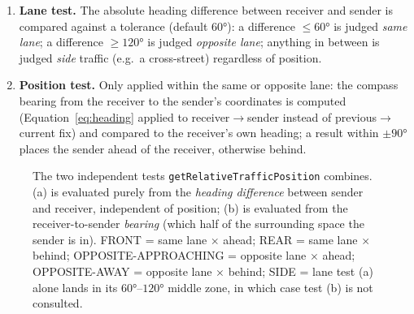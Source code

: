 \documentclass[12pt,a4paper]{report}
\begin{document}
\begin{enumerate}[leftmargin=1.8em]
\item \textbf{Lane test.} The absolute heading difference between receiver and sender is compared against a tolerance (default $60°$): a difference $\le 60°$ is judged \emph{same lane}; a difference $\ge 120°$ is judged \emph{opposite lane}; anything in between is judged \emph{side} traffic (e.g.\ a cross-street) regardless of position.
\item \textbf{Position test.} Only applied within the same or opposite lane: the compass bearing from the receiver to the sender's coordinates is computed (Equation~\ref{eq:heading} applied to receiver$\to$sender instead of previous$\to$current fix) and compared to the receiver's own heading; a result within $\pm90°$ places the sender ahead of the receiver, otherwise behind.
\end{enumerate}

\begin{figure}[H]
\centering
{}
\caption{The two independent tests \texttt{getRelativeTrafficPosition} combines. (a) is evaluated purely from the \emph{heading difference} between sender and receiver, independent of position; (b) is evaluated from the receiver-to-sender \emph{bearing} (which half of the surrounding space the sender is in). FRONT = same lane $\times$ ahead; REAR = same lane $\times$ behind; OPPOSITE-APPROACHING = opposite lane $\times$ ahead; OPPOSITE-AWAY = opposite lane $\times$ behind; SIDE = lane test (a) alone lands in its $60°$--$120°$ middle zone, in which case test (b) is not consulted.}
\label{fig:sectors}
\end{figure}
\end{document}
